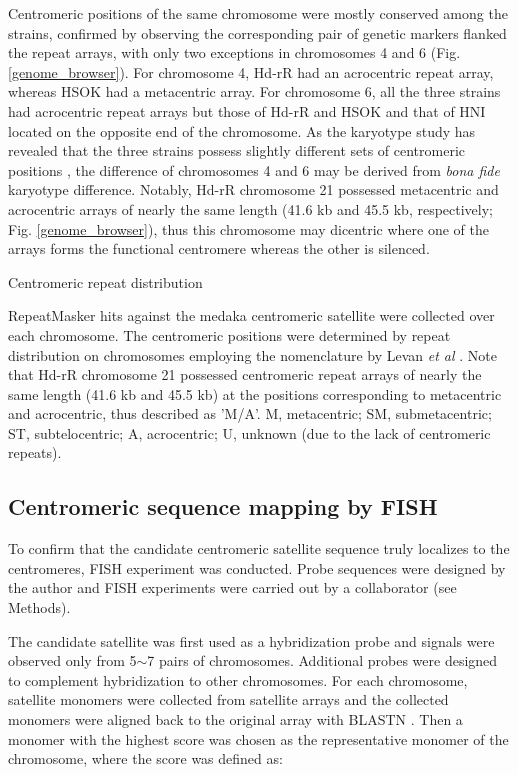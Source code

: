   Centromeric positions of the same chromosome were mostly conserved among the strains, confirmed by observing the corresponding pair of genetic markers flanked the repeat arrays, with only two exceptions in chromosomes 4 and 6 (Fig. \ref{genome_browser}). For chromosome 4, Hd-rR had an acrocentric repeat array, whereas HSOK had a metacentric array. For chromosome 6, all the three strains had acrocentric repeat arrays but those of Hd-rR and HSOK and that of HNI located on the opposite end of the chromosome. As the karyotype study has revealed that the three strains possess slightly different sets of centromeric positions \cite{}, the difference of chromosomes 4 and 6 may be derived from \textit{bona fide} karyotype difference. Notably, Hd-rR chromosome 21 possessed metacentric and acrocentric arrays of nearly the same length (41.6 kb and 45.5 kb, respectively; Fig. \ref{genome_browser}), thus this chromosome may dicentric where one of the arrays forms the functional centromere whereas the other is silenced.


  \begin{table*}[htp]
    \centering
    \caption{Centromeric repeat distribution}
    
    \label{centromeric_repeat_distribution}
    \caption*{{\small
      RepeatMasker hits against the medaka centromeric satellite were collected over each chromosome. The centromeric positions were determined by repeat distribution on chromosomes employing the nomenclature by Levan \textit{et al} \cite{Levan1964}. Note that Hd-rR chromosome 21 possessed centromeric repeat arrays of nearly the same length (41.6 kb and 45.5 kb) at the positions corresponding to metacentric and acrocentric, thus described as 'M/A'. M, metacentric; SM, submetacentric; ST, subtelocentric; A, acrocentric; U, unknown (due to the lack of centromeric repeats).
    }}
  \end{table*}


\subsection*{Centromeric sequence mapping by FISH}
  To confirm that the candidate centromeric satellite sequence truly localizes to the centromeres, FISH experiment was conducted. Probe sequences were designed by the author and FISH experiments were carried out by a collaborator (see Methods).

  The candidate satellite was first used as a hybridization probe and signals were observed only from 5$\sim$7 pairs of chromosomes. Additional probes were designed to complement hybridization to other chromosomes. For each chromosome, satellite monomers were collected from satellite arrays and the collected monomers were aligned back to the original array with BLASTN \cite{Camacho2009}. Then a monomer with the highest score was chosen as the representative monomer of the chromosome, where the score was defined as:

